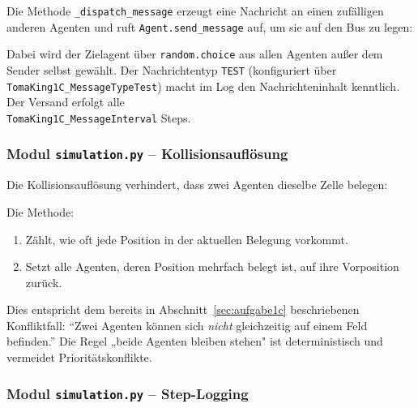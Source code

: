 Die Methode \texttt{\_dispatch\_message} erzeugt eine Nachricht an einen zufälligen anderen Agenten und ruft \texttt{Agent.send\_message} auf, um sie auf den Bus zu legen:



Dabei wird der Zielagent über \texttt{random.choice} aus allen Agenten außer dem Sender selbst gewählt. Der Nachrichtentyp \texttt{TEST} (konfiguriert über \texttt{TomaKing1C\_MessageTypeTest}) macht im Log den Nachrichteninhalt kenntlich. Der Versand erfolgt alle \\ \texttt{TomaKing1C\_MessageInterval} Steps.


\subsubsection{Modul \texttt{simulation.py} – Kollisionsauflösung}

Die Kollisionsauflösung verhindert, dass zwei Agenten dieselbe Zelle belegen:



Die Methode:
\begin{enumerate}
    \item Zählt, wie oft jede Position in der aktuellen Belegung vorkommt.
    \item Setzt alle Agenten, deren Position mehrfach belegt ist, auf ihre Vorposition zurück.
\end{enumerate}

Dies entspricht dem bereits in Abschnitt~\ref{sec:aufgabe1c} beschriebenen Konfliktfall: \enquote{Zwei Agenten können sich \textit{nicht} gleichzeitig auf einem Feld befinden.} Die Regel „beide Agenten bleiben stehen" ist deterministisch und vermeidet Prioritätskonflikte.


\subsubsection{Modul \texttt{simulation.py} – Step-Logging}

